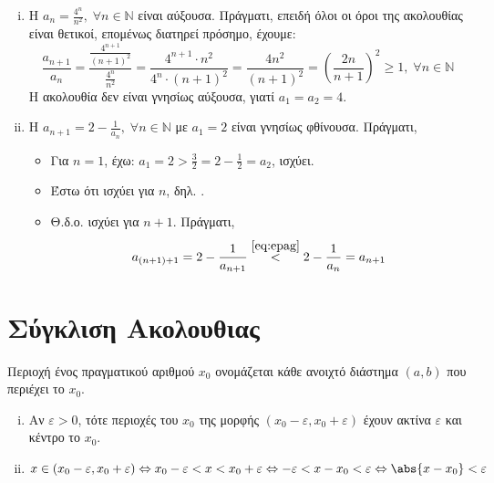 \documentclass[main.tex]{subfiles}
\begin{document}
\begin{examples}
\begin{enumerate}[i)]
        \item Η $ a_{n}= \frac{4^{n}}{n^{2}}, \; \forall n \in \mathbb{N} $ 
            είναι αύξουσα. Πράγματι, επειδή όλοι οι όροι της ακολουθίας 
            είναι θετικοί, επομένως διατηρεί πρόσημο, έχουμε:
            \[
                \frac{a_{n+1}}{a_{n}} 
                = \frac{\frac{4^{n+1}}{(n+1)^{2}}}{\frac{4^{n}}{n^{2}}} 
                = \frac{4^{n+1}\cdot n^{2}}{4^{n}\cdot (n+1)^{2}} 
                = \frac{4n^{2}}{(n+1)^{2}}
                = \left( \frac{2n}{n+1} \right)^{2} \geq 1, 
                \; \forall n \in \mathbb{N} 
            \]
            Η ακολουθία δεν είναι γνησίως αύξουσα, γιατί $ 
            a_{1}= a_{2}=4$.

        \item Η $ a_{n+1}=2 - \frac{1}{a_{n}}, \; \forall n \in \mathbb{N}
            $ με $ a_{1} = 2 $ είναι γνησίως φθίνουσα. Πράγματι, 
            \begin{itemize}
                \item Για $ n=1 $, έχω: $ a_{1}= 2 >
                    \frac{3}{2} = 2 - \frac{1}{2} = a_{2}$, ισχύει.
                \item Έστω ότι ισχύει για $n$, δηλ.
                    .
                \item Θ.δ.ο. ισχύει για $ n+1 $. Πράγματι, 
                    \[
                        a_{(n+1)+1}=2- \frac{1}{a_{n+1}}
                        \overset{\eqref{eq:epag}}{<} 2 - 
                        \frac{1}{a_{n}} = a_{n+1}
                    \] 
            \end{itemize}
    \end{enumerate}
\end{examples}

\section{Σύγκλιση Ακολουθιας}

\begin{dfn}
    \textcolor{Col\thechapter}{Περιοχή} ένος πραγματικού αριθμού $ x_{0} $ 
    ονομάζεται κάθε ανοιχτό διάστημα $(a,b)$ που περιέχει το $ x_{0} $. 
\end{dfn}

\begin{rem}
\item {}
    \begin{enumerate}[i)]
        \item 
            Αν $ \varepsilon > 0 $, τότε περιοχές του $ x_{0} $ της μορφής 
            $ (x_{0}- \varepsilon , x_{0} + \varepsilon) $ έχουν 
            \textcolor{Col\thechapter}{ακτίνα} $ \varepsilon $
            και \textcolor{Col\thechapter}{κέντρο} το $ x_{0} $. 

        \item $ x \in (x_{0}- \varepsilon, x_{0} + \varepsilon) 
            \Leftrightarrow x_{0}- \varepsilon < x < x_{0}+ \varepsilon 
            \Leftrightarrow - \varepsilon < x - x_{0} < \varepsilon 
            \Leftrightarrow \abs{x- x_{0}} < \varepsilon  $ 
    \end{enumerate}
\end{rem}
\end{document}
